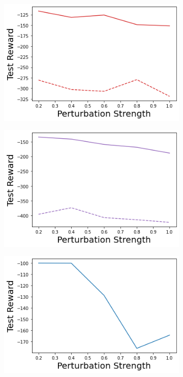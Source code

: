 \begin{figure}
    \begin{subfigure}{.24\textwidth}
        \includegraphics[width=\textwidth]{sections/011_icml2022/resources/transition_shift-DropOut-AcrobotShift-v0-mean_reward_.png}
    \end{subfigure}
    \begin{subfigure}{.24\textwidth}
        \includegraphics[width=\textwidth]{sections/011_icml2022/resources/transition_shift-Ensemble-AcrobotShift-v0-mean_reward_.png}
    \end{subfigure}
    \begin{subfigure}{.24\textwidth}
        \includegraphics[width=\textwidth]{sections/011_icml2022/resources/transition_shift-DKL-AcrobotShift-v0-mean_reward_.png}

\end{subfigure}
\end{figure}
